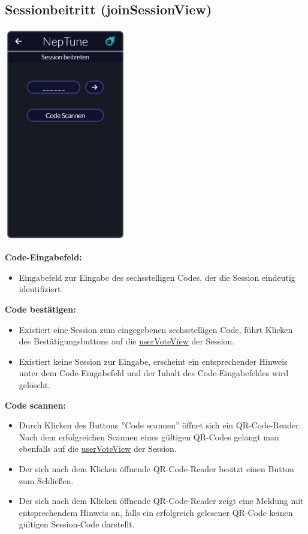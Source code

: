 \documentclass[oneside, ngerman]{sdqtechreport}
\begin{document}
\subsection{Sessionbeitritt (joinSessionView)}
\label{sec:Benutzeroberfläche:joinSessionView}


\begin{center}
    \hypertarget{joinSessionView}{}
    \includegraphics[width=0.4\textwidth]{LATEX/Pflichtenheft/GraphicDesigns/userJoinGroupPage.png}
\end{center}

\textbf{Code-Eingabefeld:}
\begin{itemize}
    \item Eingabefeld zur Eingabe des sechsstelligen Codes, der die Session eindeutig identifiziert.
\end{itemize}

\textbf{Code bestätigen:}
\begin{itemize}
    \item Existiert eine Session zum eingegebenen sechsstelligen Code, führt Klicken des Bestätigungsbuttons auf die \hyperlink{userVoteView}{userVoteView} der Session.
    \item Existiert keine Session zur Eingabe, erscheint ein entsprechender Hinweis unter dem Code-Eingabefeld und der Inhalt des Code-Eingabefeldes wird gelöscht.
\end{itemize}

\textbf{Code scannen:}
\begin{itemize}
    \item Durch Klicken des Buttons ''Code scannen'' öffnet sich ein QR-Code-Reader. Nach dem erfolgreichen Scannen eines gültigen QR-Codes gelangt man ebenfalls auf die \hyperlink{userVoteView}{userVoteView} der Session.
    \item Der sich nach dem Klicken öffnende QR-Code-Reader besitzt einen Button zum Schließen.
    \item Der sich nach dem Klicken öffnende QR-Code-Reader zeigt eine Meldung mit entsprechendem Hinweis an, falls ein erfolgreich gelesener QR-Code keinen gültigen Session-Code darstellt.
\end{itemize}
\end{document}
